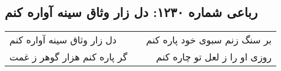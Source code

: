 \begin{center}
\section*{رباعی شماره ۱۲۳۰: دل زار وثاق سینه آواره کنم}
\label{sec:1230}
\begin{longtable}{l p{0.5cm} r}
دل زار وثاق سینه آواره کنم
&&
بر سنگ زنم سبوی خود پاره کنم
\\
گر پاره کنم هزار گوهر ز غمت
&&
روزی او را ز لعل تو چاره کنم
\\
\end{longtable}
\end{center}
